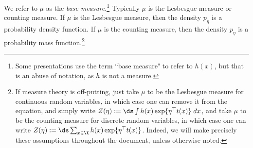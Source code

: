 \begin{definition}
We refer to $\mu$ as the \textit{base measure}.\footnote{Some presentations use the term ``base measure" to refer to $h(x)$, but that is an abuse of notation, as $h$ is not a measure.}  Typically $\mu$ is the Lesbesgue measure or counting measure.  If $\mu$ is the Lesbesgue measure, then the density $p_\eta$ is a probability density function.  If $\mu$ is the counting measure, then the density $p_\eta$ is a probability mass function.\footnote{If measure theory is off-putting, just take $\mu$ to be the Lesbesgue measure for continuous random variables, in which case one can remove it from the equation, and simply write $Z(\eta) := \ds\int  h(x) \exp \{ \eta^\top \sufficientStatsFunction (x)  \} \; dx $, and take $\mu$ to be the counting measure for discrete random variables, in which case one can write $Z(\eta) := \ds\sum_{x \in \X} h(x) \exp \{ \eta^\top \sufficientStatsFunction(x)  \} $. Indeed, we will make precisely these assumptions throughout the document, unless otherwise noted. }  %
\label{def:exponential_family}
\end{definition} 
